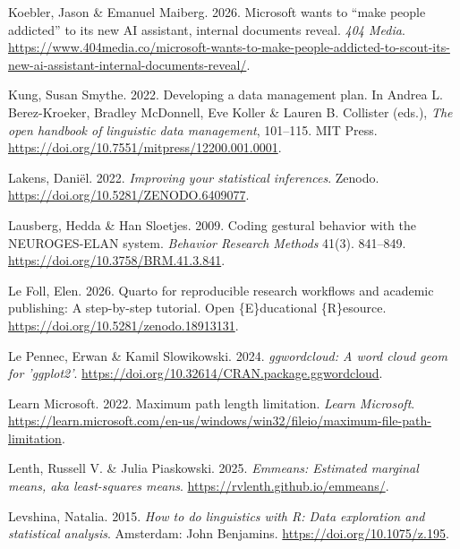\documentclass[
  letterpaper,
  DIV=11,
  numbers=noendperiod]{scrreprt}
\newlength{\cslhangindent}
\newenvironment{CSLReferences}[2] %
 {\begin{list}{}{%
  \setlength{\itemindent}{0pt}
  \setlength{\leftmargin}{0pt}
  \setlength{\parsep}{0pt}
  \ifodd #1
   \setlength{\leftmargin}{\cslhangindent}
   \setlength{\itemindent}{-1\cslhangindent}
  \fi
  \setlength{\itemsep}{#2\baselineskip}}}
 {\end{list}}
\begin{document}
\begin{CSLReferences}{1}{0}
Koebler, Jason \& Emanuel Maiberg. 2026. Microsoft wants to {``make
people addicted''} to its new AI assistant, internal documents reveal.
\emph{404 Media}.
\url{https://www.404media.co/microsoft-wants-to-make-people-addicted-to-scout-its-new-ai-assistant-internal-documents-reveal/}.

Kung, Susan Smythe. 2022. Developing a data management plan. In Andrea
L. Berez-Kroeker, Bradley McDonnell, Eve Koller \& Lauren B. Collister
(eds.), \emph{The open handbook of linguistic data management},
101--115. MIT Press.
\url{https://doi.org/10.7551/mitpress/12200.001.0001}.

Lakens, Daniël. 2022. \emph{Improving your statistical inferences}.
Zenodo. \url{https://doi.org/10.5281/ZENODO.6409077}.

Lausberg, Hedda \& Han Sloetjes. 2009. Coding gestural behavior with the
NEUROGES-ELAN system. \emph{Behavior Research Methods} 41(3). 841--849.
\url{https://doi.org/10.3758/BRM.41.3.841}.

Le Foll, Elen. 2026. Quarto for reproducible research workflows and
academic publishing: {A} step-by-step tutorial. Open \{E\}ducational
\{R\}esource. \url{https://doi.org/10.5281/zenodo.18913131}.

Le Pennec, Erwan \& Kamil Slowikowski. 2024. \emph{{ggwordcloud}: A word
cloud geom for 'ggplot2'}.
\url{https://doi.org/10.32614/CRAN.package.ggwordcloud}.

Learn Microsoft. 2022. Maximum path length limitation. \emph{Learn
Microsoft}.
\url{https://learn.microsoft.com/en-us/windows/win32/fileio/maximum-file-path-limitation}.

Lenth, Russell V. \& Julia Piaskowski. 2025. \emph{Emmeans: Estimated
marginal means, aka least-squares means}.
\url{https://rvlenth.github.io/emmeans/}.

Levshina, Natalia. 2015. \emph{How to do linguistics with {R}: Data
exploration and statistical analysis}. Amsterdam: John Benjamins.
\url{https://doi.org/10.1075/z.195}.


\end{CSLReferences}
\end{document}
